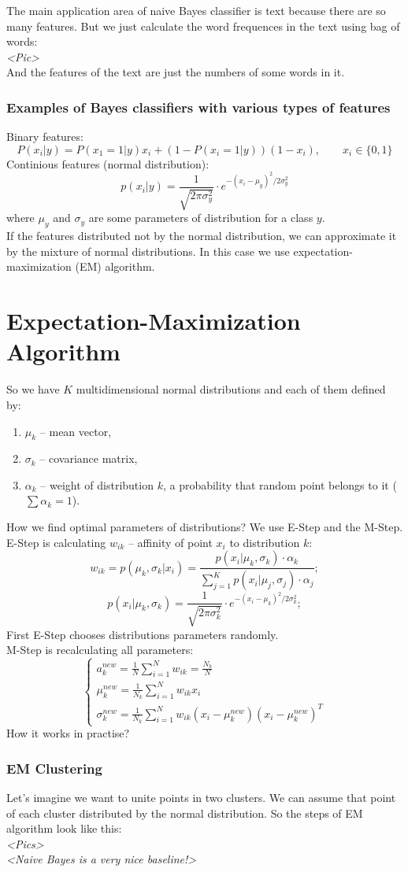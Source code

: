 The main application area of naive Bayes classifier is text because there are so many features. But we just calculate the word frequences in the text using bag of words:\\
{\it <Pic>}\\
And the features of the text are just the numbers of some words in it.

\subsubsection*{Examples of Bayes classifiers with various types of features}

Binary features:
$$P(x_i|y)=P(x_1=1|y)x_i+(1-P(x_i=1|y))(1-x_i),\qquad x_i\in\{0,1\}$$
Continious features (normal distribution):
$$p(x_i|y)=\frac{1}{\sqrt{2\pi\sigma_y^2}}\cdot e^{-(x_i-\mu_y)^2/2\sigma_y^2}$$
where $\mu_y$ and $\sigma_y$ are some parameters of distribution for a class $y$. \\
If the features distributed not by the normal distribution, we can approximate it by the mixture of normal distributions. In this case we use expectation-maximization (EM) algorithm.

\section{Expectation-Maximization Algorithm}

So we have $K$ multidimensional normal distributions and each of them defined by:
\begin{enumerate}[label=$\bullet$]
	\item $\mu_k$ -- mean vector,
	\item $\sigma_k$ -- covariance matrix,
	\item $\alpha_k$ -- weight of distribution $k$, a probability that random point belongs to it ($\sum\alpha_k=1$).
\end{enumerate}
How we find optimal parameters of distributions? We use E-Step and the M-Step. E-Step is calculating $w_{ik}$ -- affinity of point $x_i$ to distribution $k$:
$$w_{ik} = p(\mu_k,\sigma_k|x_i)=\frac{p(x_i|\mu_k,\sigma_k)\cdot\alpha_k}{\sum\limits_{j=1}^{K}p(x_i|\mu_j,\sigma_j)\cdot\alpha_j};$$
$$p(x_i|\mu_k, \sigma_k)=\frac{1}{\sqrt{2\pi\sigma_k^2}}\cdot e^{-(x_i-\mu_k)^2/2\sigma_k^2};$$
First E-Step chooses distributions parameters randomly.\\
M-Step is recalculating all parameters:
$$\begin{cases}
	a_k^{new}=\frac{1}{N}\sum\limits_{i=1}^{N}w_{ik}=\frac{N_k}{N} \\
	\mu_k^{new}=\frac{1}{N_k}\sum\limits_{i=1}^{N}w_{ik}x_i \\
	\sigma_k^{new}=\frac{1}{N_k}\sum\limits_{i=1}^{N}w_{ik}(x_i-\mu_k^{new})(x_i-\mu_k^{new})^T
\end{cases}$$
How it works in practise?

\subsubsection*{EM Clustering}

Let's imagine we want to unite points in two clusters. We can assume that point of each cluster distributed by the normal distribution. So the steps of EM algorithm look like this:\\
{\it <Pics>}\\
{\it <Naive Bayes is a very nice baseline!>}